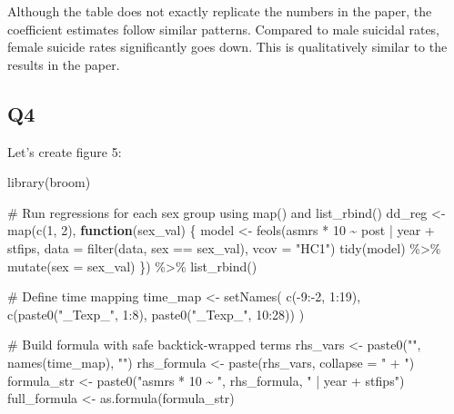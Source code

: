 \documentclass[
  letterpaper,
  DIV=11,
  numbers=noendperiod]{scrartcl}
\newenvironment{Shaded}{\begin{snugshade}}{\end{snugshade}}
\newcommand{\AttributeTok}[1]{\textcolor[rgb]{0.40,0.45,0.13}{#1}}
\newcommand{\CommentTok}[1]{\textcolor[rgb]{0.37,0.37,0.37}{#1}}
\newcommand{\ControlFlowTok}[1]{\textcolor[rgb]{0.00,0.23,0.31}{\textbf{#1}}}
\newcommand{\DecValTok}[1]{\textcolor[rgb]{0.68,0.00,0.00}{#1}}
\newcommand{\FunctionTok}[1]{\textcolor[rgb]{0.28,0.35,0.67}{#1}}
\newcommand{\NormalTok}[1]{\textcolor[rgb]{0.00,0.23,0.31}{#1}}
\newcommand{\OtherTok}[1]{\textcolor[rgb]{0.00,0.23,0.31}{#1}}
\newcommand{\SpecialCharTok}[1]{\textcolor[rgb]{0.37,0.37,0.37}{#1}}
\newcommand{\StringTok}[1]{\textcolor[rgb]{0.13,0.47,0.30}{#1}}
\begin{document}
Although the table does not exactly replicate the numbers in the paper,
the coefficient estimates follow similar patterns. Compared to male
suicidal rates, female suicide rates significantly goes down. This is
qualitatively similar to the results in the paper.

\subsection{Q4}\label{q4}

Let's create figure 5:

\begin{Shaded}
\begin{Highlighting}[]
\FunctionTok{library}\NormalTok{(broom) }

\CommentTok{\# Run regressions for each sex group using map() and list\_rbind()}
\NormalTok{dd\_reg }\OtherTok{\textless{}{-}} \FunctionTok{map}\NormalTok{(}\FunctionTok{c}\NormalTok{(}\DecValTok{1}\NormalTok{, }\DecValTok{2}\NormalTok{), }\ControlFlowTok{function}\NormalTok{(sex\_val) \{}
\NormalTok{  model }\OtherTok{\textless{}{-}} \FunctionTok{feols}\NormalTok{(asmrs }\SpecialCharTok{*} \DecValTok{10} \SpecialCharTok{\textasciitilde{}}\NormalTok{ post }\SpecialCharTok{|}\NormalTok{ year }\SpecialCharTok{+}\NormalTok{ stfips,}
                 \AttributeTok{data =} \FunctionTok{filter}\NormalTok{(data, sex }\SpecialCharTok{==}\NormalTok{ sex\_val),}
                 \AttributeTok{vcov =} \StringTok{"HC1"}\NormalTok{)}
  \FunctionTok{tidy}\NormalTok{(model) }\SpecialCharTok{\%\textgreater{}\%} \FunctionTok{mutate}\NormalTok{(}\AttributeTok{sex =}\NormalTok{ sex\_val)}
\NormalTok{\}) }\SpecialCharTok{\%\textgreater{}\%} \FunctionTok{list\_rbind}\NormalTok{()}

\CommentTok{\# Define time mapping}
\NormalTok{time\_map }\OtherTok{\textless{}{-}} \FunctionTok{setNames}\NormalTok{(}
  \FunctionTok{c}\NormalTok{(}\SpecialCharTok{{-}}\DecValTok{9}\SpecialCharTok{:{-}}\DecValTok{2}\NormalTok{, }\DecValTok{1}\SpecialCharTok{:}\DecValTok{19}\NormalTok{),}
  \FunctionTok{c}\NormalTok{(}\FunctionTok{paste0}\NormalTok{(}\StringTok{"\_Texp\_"}\NormalTok{, }\DecValTok{1}\SpecialCharTok{:}\DecValTok{8}\NormalTok{), }\FunctionTok{paste0}\NormalTok{(}\StringTok{"\_Texp\_"}\NormalTok{, }\DecValTok{10}\SpecialCharTok{:}\DecValTok{28}\NormalTok{))}
\NormalTok{)}

\CommentTok{\# Build formula with safe backtick{-}wrapped terms}
\NormalTok{rhs\_vars }\OtherTok{\textless{}{-}} \FunctionTok{paste0}\NormalTok{(}\StringTok{"\textasciigrave{}"}\NormalTok{, }\FunctionTok{names}\NormalTok{(time\_map), }\StringTok{"\textasciigrave{}"}\NormalTok{)}
\NormalTok{rhs\_formula }\OtherTok{\textless{}{-}} \FunctionTok{paste}\NormalTok{(rhs\_vars, }\AttributeTok{collapse =} \StringTok{" + "}\NormalTok{)}
\NormalTok{formula\_str }\OtherTok{\textless{}{-}} \FunctionTok{paste0}\NormalTok{(}\StringTok{"asmrs * 10 \textasciitilde{} "}\NormalTok{, rhs\_formula, }\StringTok{" | year + stfips"}\NormalTok{)}
\NormalTok{full\_formula }\OtherTok{\textless{}{-}} \FunctionTok{as.formula}\NormalTok{(formula\_str)}


\end{Highlighting}
\end{Shaded}
\end{document}
